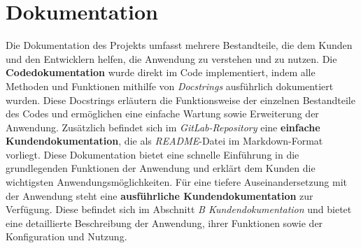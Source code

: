 \section{Dokumentation}
Die Dokumentation des Projekts umfasst mehrere Bestandteile, die dem Kunden und den Entwicklern helfen, die Anwendung zu verstehen und zu nutzen.
Die \textbf{Codedokumentation} wurde direkt im Code implementiert, indem alle Methoden und Funktionen mithilfe von \textit{Docstrings} ausführlich dokumentiert wurden.
Diese Docstrings erläutern die Funktionsweise der einzelnen Bestandteile des Codes und ermöglichen eine einfache Wartung sowie Erweiterung der Anwendung.
Zusätzlich befindet sich im \textit{GitLab-Repository} eine \textbf{einfache Kundendokumentation}, die als \textit{README}-Datei im Markdown-Format vorliegt.
Diese Dokumentation bietet eine schnelle Einführung in die grundlegenden Funktionen der Anwendung und erklärt dem Kunden die wichtigsten Anwendungsmöglichkeiten.
Für eine tiefere Auseinandersetzung mit der Anwendung steht eine \textbf{ausführliche Kundendokumentation} zur Verfügung.
Diese befindet sich im Abschnitt \textit{B Kundendokumentation} und bietet eine detaillierte Beschreibung der Anwendung, ihrer Funktionen sowie der Konfiguration und Nutzung.
